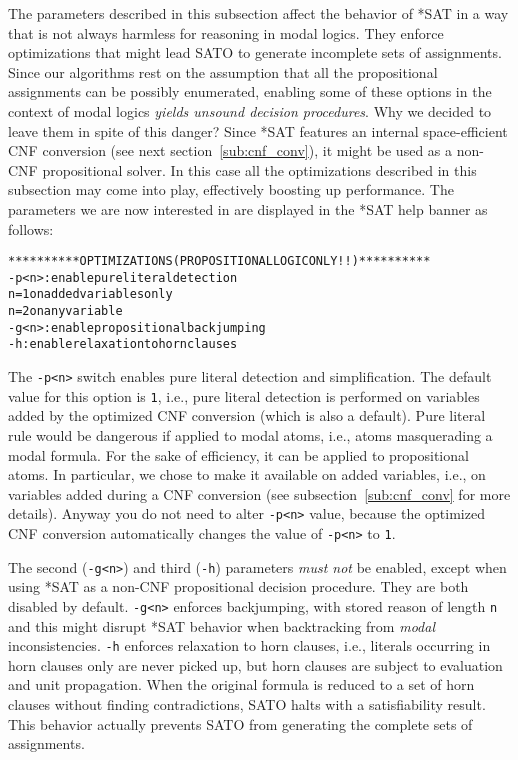 \documentclass[12pt]{report}
\begin{document}
The parameters described in this subsection affect the behavior of
*SAT in a way that is not always harmless for reasoning in modal
logics. They enforce optimizations that might lead SATO to generate incomplete
sets of assignments. Since our algorithms rest on the assumption that all
the propositional assignments can be possibly enumerated, enabling
some of these options in the context of modal logics \textit{yields unsound
decision procedures}. Why we decided to leave them in spite of this
danger? Since *SAT features an internal space-efficient CNF conversion
(see next section~\ref{sub:cnf_conv}),
it might be used as a non-CNF propositional solver. In this case all
the optimizations described in this subsection may come into play,
effectively boosting up performance.
The parameters we are now interested in are displayed in the *SAT help
banner as follows:
\begin{alltt}
\scriptsize
********** OPTIMIZATIONS (PROPOSITIONAL LOGIC ONLY!!)  **********
   -p<n>    : enable pure literal detection     
              n=1 on added variables only       
              n=2 on any variable               
   -g<n>    : enable propositional backjumping  
   -h       : enable relaxation to horn clauses 
\end{alltt}

The {\tt -p<n>} switch enables pure literal detection and
simplification. The default value for this option is {\tt 1}, i.e.,
pure literal detection is performed on variables added by the
optimized CNF conversion (which is also a default). Pure literal rule
would be dangerous if applied to modal atoms, i.e., atoms masquerading a
modal formula. For the sake of efficiency, it can be applied to
propositional atoms. In particular, we chose to make it available on
added variables, i.e., on variables added during a CNF conversion (see
subsection~\ref{sub:cnf_conv} for more details). Anyway you do not need to
alter {\tt -p<n>} value, because the optimized CNF conversion
automatically changes the value of  {\tt -p<n>} to {\tt 1}.

The second ({\tt -g<n>}) and third ({\tt -h}) 
parameters \textit{must not} be enabled, except when
using *SAT as a non-CNF propositional decision procedure. They are
both disabled by default. {\tt -g<n>}
enforces backjumping, with stored reason of length {\tt n} and this
might disrupt *SAT behavior when backtracking from \textit{modal}
inconsistencies. {\tt -h} enforces relaxation to horn clauses, i.e.,
literals occurring in horn clauses only are never picked up,
but horn clauses are subject to evaluation and unit propagation. When the
original formula is reduced to a set of horn clauses without finding
contradictions, SATO halts with a satisfiability result. This behavior
actually prevents SATO from generating the complete sets of
assignments.
\end{document}
